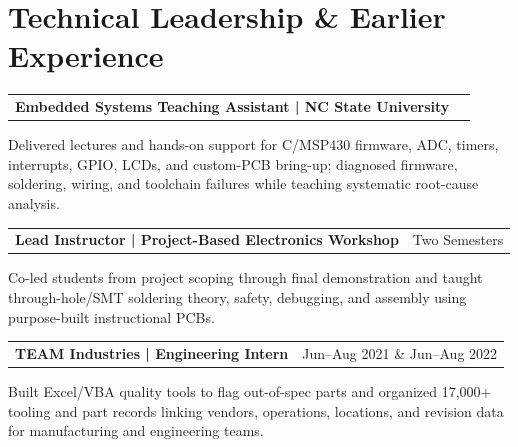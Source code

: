 \documentclass[10pt,letterpaper]{article}
\makeatletter
\newcommand{\resumeentry}[3]{%
  \begin{tabularx}{\textwidth}{@{}Xr@{}}
    \textbf{#1} & #2
  \end{tabularx}\vspace{-0.06cm}
  #3
}
\makeatother
\begin{document}
\section{Technical Leadership \& Earlier Experience}
\resumeentry{Embedded Systems Teaching Assistant | NC State University}{}{
\begin{resumebullets}
  \item Delivered lectures and hands-on support for C/MSP430 firmware, ADC, timers, interrupts, GPIO, LCDs, and custom-PCB bring-up; diagnosed firmware, soldering, wiring, and toolchain failures while teaching systematic root-cause analysis.
\end{resumebullets}}

\resumeentry{Lead Instructor | Project-Based Electronics Workshop}{Two Semesters}{
\begin{resumebullets}
  \item Co-led students from project scoping through final demonstration and taught through-hole/SMT soldering theory, safety, debugging, and assembly using purpose-built instructional PCBs.
\end{resumebullets}}

\resumeentry{TEAM Industries | Engineering Intern}{Jun--Aug 2021 \& Jun--Aug 2022}{
\begin{resumebullets}
  \item Built Excel/VBA quality tools to flag out-of-spec parts and organized 17,000+ tooling and part records linking vendors, operations, locations, and revision data for manufacturing and engineering teams.
\end{resumebullets}}
\end{document}
